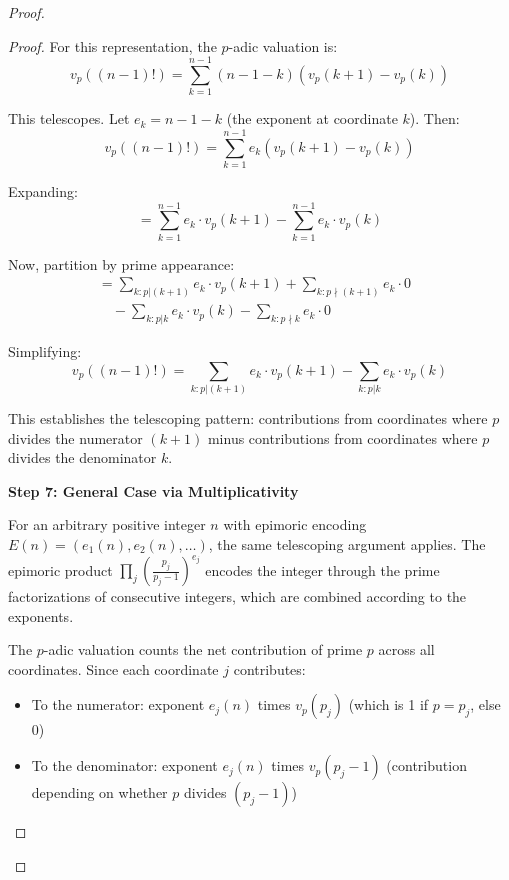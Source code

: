 \begin{proof}
\begin{proof}
For this representation, the $p$-adic valuation is:
\begin{equation}
v_p((n-1)!) = \sum_{k=1}^{n-1} (n-1-k) \left(v_p(k+1) - v_p(k)\right)
\end{equation}

This telescopes. Let $e_k = n - 1 - k$ (the exponent at coordinate $k$). Then:
\begin{equation}
v_p((n-1)!) = \sum_{k=1}^{n-1} e_k \left(v_p(k+1) - v_p(k)\right)
\end{equation}

Expanding:
\begin{equation}
= \sum_{k=1}^{n-1} e_k \cdot v_p(k+1) - \sum_{k=1}^{n-1} e_k \cdot v_p(k)
\end{equation}

Now, partition by prime appearance:
\begin{align}
= \sum_{k: p|(k+1)} e_k \cdot v_p(k+1) + \sum_{k: p \nmid (k+1)} e_k \cdot 0 & \\
\quad - \sum_{k: p|k} e_k \cdot v_p(k) - \sum_{k: p \nmid k} e_k \cdot 0 &
\end{align}

Simplifying:
\begin{equation}
v_p((n-1)!) = \sum_{k: p|(k+1)} e_k \cdot v_p(k+1) - \sum_{k: p|k} e_k \cdot v_p(k)
\end{equation}

This establishes the telescoping pattern: contributions from coordinates where $p$ divides the numerator $(k+1)$ minus contributions from coordinates where $p$ divides the denominator $k$.

\noindent \textbf{Step 7: General Case via Multiplicativity}

For an arbitrary positive integer $n$ with epimoric encoding $E(n) = (e_1(n), e_2(n), \ldots)$, the same telescoping argument applies. The epimoric product $\prod_j \left(\frac{p_j}{p_j - 1}\right)^{e_j}$ encodes the integer through the prime factorizations of consecutive integers, which are combined according to the exponents.

The $p$-adic valuation counts the net contribution of prime $p$ across all coordinates. Since each coordinate $j$ contributes:
\begin{itemize}
\item To the numerator: exponent $e_j(n)$ times $v_p(p_j)$ (which is 1 if $p = p_j$, else 0)
\item To the denominator: exponent $e_j(n)$ times $v_p(p_j - 1)$ (contribution depending on whether $p$ divides $(p_j - 1)$)
\end{itemize}


\end{proof}
\end{proof}
